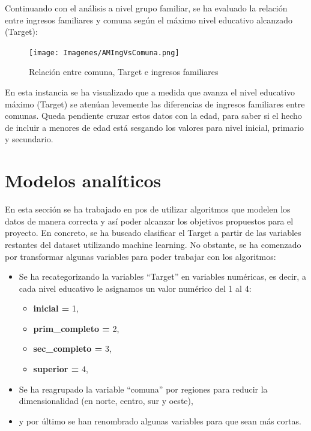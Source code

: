 \documentclass[a4paper]{article}
\begin{document}
        \newpage

        Continuando con el análisis a nivel grupo familiar, se ha evaluado la relación entre ingresos familiares y comuna según el máximo nivel educativo alcanzado (Target):
        \begin{figure}[H]
            \centering
            \texttt{[image: Imagenes/AMIngVsComuna.png]}
            \caption{Relación entre comuna, Target e ingresos familiares}
            \label{AM Location, Taget and Familiar Income}
        \end{figure}
 
        En esta instancia se ha visualizado que a medida que avanza el nivel educativo máximo (Target) se atenúan levemente las diferencias de ingresos familiares entre comunas. Queda pendiente cruzar estos datos con la edad, para saber si el hecho de incluir a menores de edad está sesgando los valores para nivel inicial, primario y secundario.
 
\newpage


\section{Modelos analíticos}

    En esta sección se ha trabajado en pos de utilizar algoritmos que modelen los datos de manera correcta y así poder alcanzar los objetivos propuestos para el proyecto. En concreto, se ha buscado clasificar el Target a partir de las variables restantes del dataset utilizando machine learning. 
    No obstante, se ha comenzado por transformar algunas variables para poder trabajar con los algoritmos:
    \begin{itemize}
        \item Se ha recategorizando la variables ``Target'' en variables numéricas, es decir, a cada nivel educativo le asignamos un valor numérico del 1 al 4:
        \begin{itemize}
            \item \textbf{inicial =} 1,
            \item \textbf{prim\_completo =} 2,
            \item \textbf{sec\_completo =} 3,
            \item \textbf{superior =} 4,
        \end{itemize}
        \item Se ha reagrupado la variable ``comuna'' por regiones para reducir la dimensionalidad (en norte, centro, sur y oeste),
        \item y por último se han renombrado algunas variables para que sean más cortas.
    \end{itemize}
\end{document}
